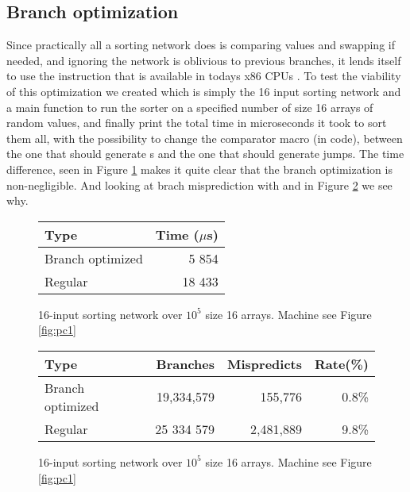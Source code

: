 \subsection{Branch optimization}
Since practically all a sorting network does is comparing values and swapping
if needed, and ignoring the network is oblivious to previous branches, it lends
itself to use the  instruction that is available in todays x86 CPUs
\cite{CCNS-2015}. To test the viability of this optimization we created
 which is simply the 16 input sorting network and a main function
to run the sorter on a specified number of size 16 arrays of random values, and
finally print the total time in microseconds it took to sort them all, with the
possibility to change the comparator macro (in code), between the one that
should generate s and the one that should generate jumps. The time
difference, seen in Figure \ref{fig:branch-time} makes it quite clear that the
branch optimization is non-negligible. And looking at brach misprediction with
 and  in Figure \ref{fig:branch-predict} we see
why.

\begin{figure}
    \centering
    \begin{tabular}{lr}
        Type             & Time ($\mu$s)\\\hline
        Branch optimized & 5 854\\
        Regular          & 18 433\\
    \end{tabular}
    \caption{16-input sorting network over $10^5$ size 16 arrays. Machine see
    Figure \ref{fig:pc1}}
    \label{fig:branch-time}
\end{figure}

\begin{figure}
    \centering
    \begin{tabular}{lrrr}
        Type             & Branches & Mispredicts & Rate(\%) \\\hline
        Branch optimized & 19,334,579& 155,776    &  0.8\%\\
        Regular          & 25 334 579& 2,481,889  &  9.8\%\\
    \end{tabular}
    \caption{16-input sorting network over $10^5$ size 16 arrays. Machine see
    Figure \ref{fig:pc1}}
    \label{fig:branch-predict}
\end{figure}

